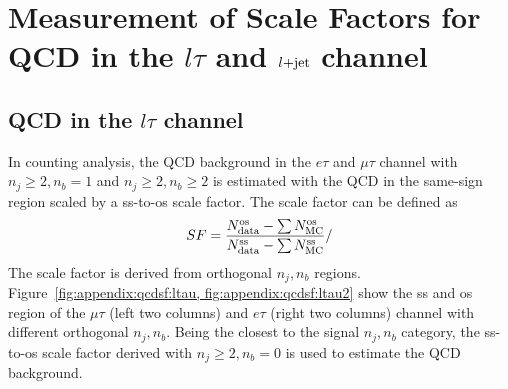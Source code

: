 \section{Measurement of Scale Factors for QCD in the $l\tau$ and $l\rm{+jet}$ channel}
\label{sec:app:qcd}

\subsection{QCD in the $l\tau$ channel }
In counting analysis, the QCD background in the $e\tau$ and $\mu\tau$ channel with $n_j\geq 2,n_b=1$ and
$n_j\geq 2,n_b\geq2$ is estimated with the QCD in the same-sign region scaled by a ss-to-os scale factor.
The scale factor can be defined as
\begin{equation}
    SF = \frac{N^{\rm{os}}_{\rm{data}} - \sum N^{\rm{os}}_{\rm{MC}} } {N^{\rm{ss}}_{\rm{data}} - \sum N^{\rm{ss}}_{\rm{MC}} }/
\end{equation}
\noindent The scale factor is derived from orthogonal $n_j,n_b$ regions.
Figure~\ref{fig:appendix:qcdsf:ltau, fig:appendix:qcdsf:ltau2} show the ss and os region of the $\mu\tau$ (left two columns) and 
$e\tau$ (right two columns) channel with different orthogonal $n_j,n_b$. Being the closest to the signal
$n_j,n_b$ category, the ss-to-os scale factor derived with $n_j\geq2,n_b=0$ is used to estimate the QCD 
background.


